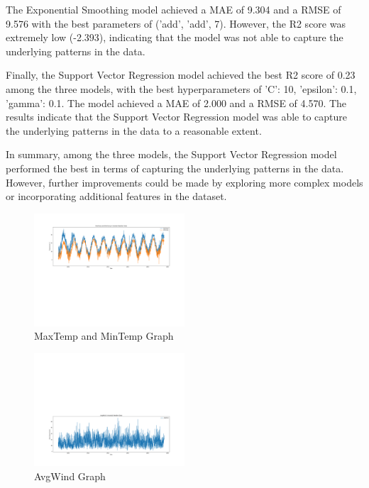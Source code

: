\documentclass[conference,letterpaper]{IEEEtran}
\begin{document}
The Exponential Smoothing model achieved a MAE of 9.304 and a RMSE of 9.576 with the best parameters of ('add', 'add', 7). However, the R2 score was extremely low (-2.393), indicating that the model was not able to capture the underlying patterns in the data.

Finally, the Support Vector Regression model achieved the best R2 score of 0.23 among the three models, with the best hyperparameters of {'C': 10, 'epsilon': 0.1, 'gamma': 0.1}. The model achieved a MAE of 2.000 and a RMSE of 4.570. The results indicate that the Support Vector Regression model was able to capture the underlying patterns in the data to a reasonable extent.

In summary, among the three models, the Support Vector Regression model performed the best in terms of capturing the underlying patterns in the data. However, further improvements could be made by exploring more complex models or incorporating additional features in the dataset.


\begin{figure}[hbt!] 
\centering
\includegraphics[width=0.5\textwidth]{figures/istanbul_temps.png}
\caption{MaxTemp and MinTemp Graph}
\label{fig:MaxTemp_MinTemp}
\end{figure}

\begin{figure}[hbt!] 
\centering
\includegraphics[width=0.5\textwidth]{figures/istanbul_weather_seasonality_alt.png}
\caption{AvgWind Graph}
\label{fig:AvgWind}
\end{figure}
\end{document}
